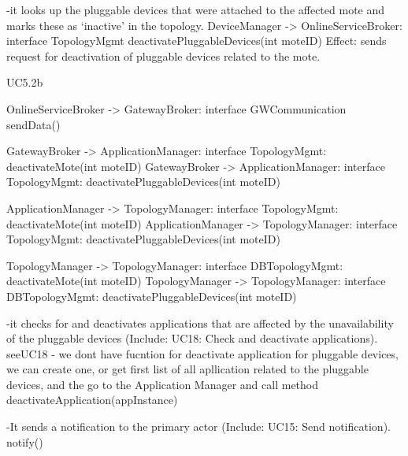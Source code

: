             -it looks up the pluggable devices that were attached to the affected mote and marks these
                as `inactive' in the topology.
            DeviceManager -> OnlineServiceBroker: interface TopologyMgmt deactivatePluggableDevices(int moteID)
            Effect: sends request for deactivation of pluggable devices related to the mote.
            \item UC5.2b

            OnlineServiceBroker -> GatewayBroker: interface GWCommunication
            sendData()

            GatewayBroker -> ApplicationManager: interface TopologyMgmt: deactivateMote(int moteID)
            GatewayBroker -> ApplicationManager: interface TopologyMgmt: deactivatePluggableDevices(int moteID)

            ApplicationManager -> TopologyManager: interface TopologyMgmt: deactivateMote(int moteID)
            ApplicationManager -> TopologyManager: interface TopologyMgmt: deactivatePluggableDevices(int moteID)

            TopologyManager -> TopologyManager: interface DBTopologyMgmt: deactivateMote(int moteID)
            TopologyManager -> TopologyManager: interface DBTopologyMgmt: deactivatePluggableDevices(int moteID)

            -it checks for and deactivates applications that are affected by the unavailability of the
                pluggable devices (Include: UC18: Check and deactivate applications).
                seeUC18 - we dont have fucntion for deactivate application for pluggable devices, we can create one, or get
                            first list of all apllication related to the pluggable devices, and the go to the Application Manager and
                            call method deactivateApplication(appInstance)

            -It sends a notification to the primary actor (Include: UC15: Send notification).
            notify()



